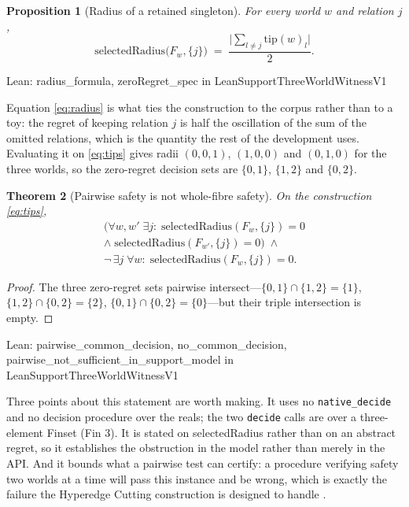 \documentclass[conference]{IEEEtran}
\newtheorem{theorem}{Theorem}
\newtheorem{proposition}[theorem]{Proposition}
\theoremstyle{definition}
\newcommand{\lean}[1]{\textsf{\footnotesize #1}}
\newcommand{\leanbox}[1]{%
  \par\vspace{2pt}\noindent
  {\footnotesize\textsf{Lean: #1}}\par\vspace{2pt}}
\begin{document}
\begin{proposition}[Radius of a retained singleton]
\label{prop:radius}
For every world $w$ and relation $j$,
\begin{equation}
\mathrm{selectedRadius}\bigl(F_{w},\{j\}\bigr)
\;=\;\frac{\bigl|\sum_{l\neq j}\mathrm{tip}(w)_{l}\bigr|}{2}.
\label{eq:radius}
\end{equation}
\end{proposition}

\leanbox{\lean{radius\_formula}, \lean{zeroRegret\_spec} in
\lean{LeanSupportThreeWorldWitnessV1}}

Equation \eqref{eq:radius} is what ties the construction to the corpus rather than to a toy:
the regret of keeping relation $j$ is half the oscillation of the sum of the omitted
relations, which is the quantity the rest of the development uses. Evaluating it on
\eqref{eq:tips} gives radii $(0,0,1)$, $(1,0,0)$ and $(0,1,0)$ for the three worlds, so the
zero-regret decision sets are $\{0,1\}$, $\{1,2\}$ and $\{0,2\}$.

\begin{theorem}[Pairwise safety is not whole-fibre safety]
\label{thm:threeworld}
On the construction \eqref{eq:tips},
\begin{multline}
\bigl(\forall w,w'\;\exists j:\;
 \mathrm{selectedRadius}(F_{w},\{j\})=0 \\ \wedge\;
 \mathrm{selectedRadius}(F_{w'},\{j\})=0\bigr)
\;\wedge\;\\
\neg\,\exists j\;\forall w:\;\mathrm{selectedRadius}(F_{w},\{j\})=0 .
\label{eq:threeworld}
\end{multline}
\end{theorem}

\begin{proof}
The three zero-regret sets pairwise intersect---$\{0,1\}\cap\{1,2\}=\{1\}$,
$\{1,2\}\cap\{0,2\}=\{2\}$, $\{0,1\}\cap\{0,2\}=\{0\}$---but their triple intersection is
empty.
\end{proof}

\leanbox{\lean{pairwise\_common\_decision}, \lean{no\_common\_decision},
\lean{pairwise\_not\_sufficient\_in\_support\_model} in
\lean{LeanSupportThreeWorldWitnessV1}}

Three points about this statement are worth making. It uses no \texttt{native\_decide} and no
decision procedure over the reals; the two \texttt{decide} calls are over a three-element
\lean{Finset (Fin 3)}. It is stated on \lean{selectedRadius} rather than on an abstract
regret, so it establishes the obstruction in the model rather than merely in the API. And it
bounds what a pairwise test can certify: a procedure verifying safety two worlds at a time
will pass this instance and be wrong, which is exactly the failure the Hyperedge Cutting
construction is designed to handle \cite{javdani2014}.
\end{document}
